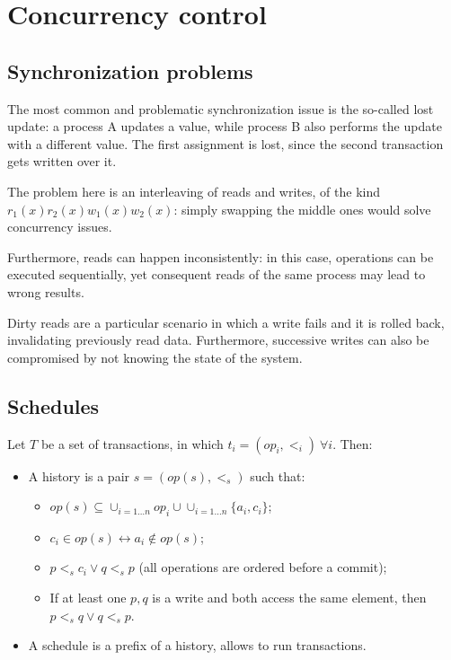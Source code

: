 
\section{Concurrency control}
\subsection{Synchronization problems}
The most common and problematic synchronization issue is the so-called lost update: a process A updates a value, while process B also performs the update with a different value. The first assignment is lost, since the second transaction gets written over it.

The problem here is an interleaving of reads and writes, of the kind $r_1(x)r_2(x)w_1(x)w_2(x)$: simply swapping the middle ones would solve concurrency issues.

Furthermore, reads can happen inconsistently: in this case, operations can be executed sequentially, yet consequent reads of the same process may lead to wrong results.

Dirty reads are a particular scenario in which a write fails and it is rolled back, invalidating previously read data. Furthermore, successive writes can also be compromised by not knowing the state of the system.

\subsection{Schedules}
Let $T$ be a set of transactions, in which $t_i = (op_i, <_i)\ \forall i$. Then:
\begin{itemize}
	\item A history is a pair $s = (op(s), <_s)$ such that:
	\begin{itemize}
		\item $op(s) \subseteq \cup_{i=1\dots n} op_i \cup \cup_{i=1\dots n} \{a_i, c_i\}$;
		\item $c_i \in op(s) \leftrightarrow a_i \notin op(s)$;
		\item $p <_s c_i \lor q <_s p$ (all operations are ordered before a commit);
		\item If at least one $p, q$ is a write and both access the same element, then $p <_s q \lor q <_s p$.
	\end{itemize}
	\item A schedule is a prefix of a history, allows to run transactions.
\end{itemize}

